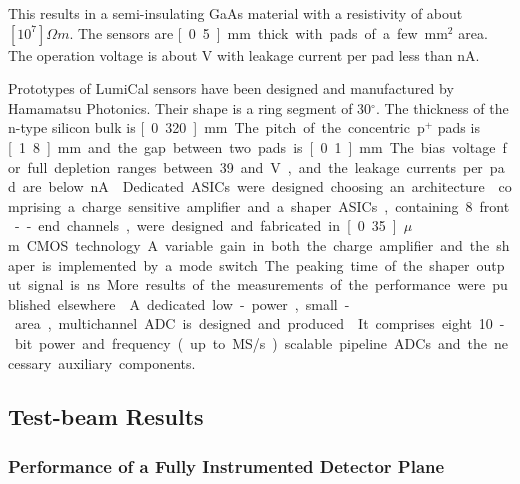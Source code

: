 This results in a semi-insulating GaAs material with a resistivity of about $[10^7]{\Omega m}$.
The sensors are \unit[0.5]{mm} thick with pads of a few mm$^2$ area. The operation voltage is about \unit[100]{V} with
leakage current per pad less than \unit[500]{nA}.

Prototypes of LumiCal sensors have been designed
and manufactured by Hamamatsu
Photonics.
Their shape is a ring segment of 30$^\circ$.
The thickness of the n-type silicon bulk is \unit[0.320]{mm}.
The pitch of the concentric p$^+$ pads is \unit[1.8]{mm} and
the gap between two pads is \unit[0.1]{mm}.
The bias voltage for full depletion ranges between 39 and \unit[45]{V},
and the leakage currents per pad are below \unit[5]{nA}~\cite{eudet2009}.

Dedicated ASICs were designed choosing
an
architecture~\cite{Boie1982365,Gatti:1986qq}
comprising a charge sensitive amplifier and a shaper.
ASICs, containing 8 front--end channels, were designed and fabricated in \unit[0.35]{$\mu$ m} CMOS technology.
A variable gain in both the charge amplifier and
the shaper is implemented by a mode switch. The peaking time of the shaper output signal is \unit[60]{ns}.
More results of the measurements of the performance were published elsewhere~\cite{4600902}.
A dedicated low-power, small-area, multichannel ADC is designed and produced~\cite{6156491}.
It comprises eight 10-bit power and frequency (up to \unit[24]{MS/s}) scalable pipeline ADCs and the necessary
auxiliary components.


\subsection{Test-beam Results}

\subsubsection{Performance of a Fully Instrumented  Detector Plane}


